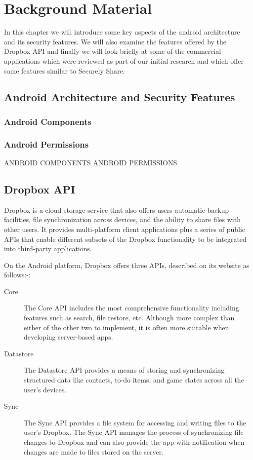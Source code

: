 
\chapter{Background Material}
\label{cha:background}

In this chapter we will introduce some key aspects of the android architecture and its security features.  We will also examine the features offered by the Dropbox API and finally we will look briefly at some of the commercial applications which were reviewed as part of our initial research and which offer some features similar to Securely Share.

\section{Android Architecture and Security Features}
\subsection{Android Components}
\subsection{Android Permissions}

ANDROID COMPONENTS
ANDROID PERMISSIONS
\section{Dropbox API}
\label{sec:dropbox}
Dropbox is a cloud storage service that also offers users  automatic backup facilities, file synchronization across devices, and the ability to share files with other users.  It provides multi-platform client applications plus a series of public APIs that enable different subsets of the Dropbox functionality to be integrated into third-party applications.  

On the Android platform, Dropbox offers three APIs, described on its website as follows:-:
\begin{description}
	\item[Core] The Core API includes the most comprehensive functionality including features such as search, file restore, etc. Although more complex than either of the other two to implement, it is often more suitable when developing server-based apps.
	\item[Datastore] The Datastore API provides a means of storing and synchronizing structured data like contacts, to-do items, and game states across  all the user's devices.
	\item[Sync] The Sync API provides a file system for accessing and writing files to the user's Dropbox.  The Sync API manages the process of synchronizing file changes to Dropbox and can also provide the app with notification when changes are made to files stored on the server.
\end{description}

